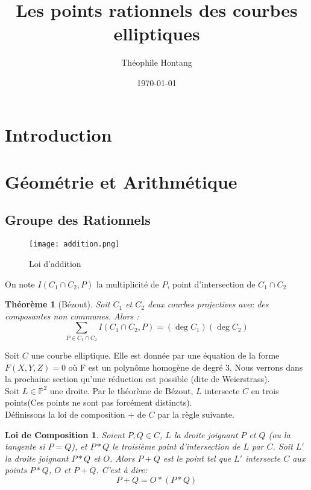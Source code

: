 \documentclass[a4paper]{article}
\title{Les points rationnels des courbes elliptiques}
\author{Théophile Hontang}
\date{\today}
\newtheorem{theorem}{Théorème}
\newtheorem{loi}{Loi de Composition}
\begin{document}
\maketitle
\tableofcontents
\newpage
\section*{Introduction}

\newpage


\section{Géométrie et Arithmétique}
\subsection{Groupe des Rationnels}
\begin{figure}[h]
\centering
\texttt{[image: addition.png]}
\caption{Loi d'addition}
\label{neutre}
\end{figure} 
On note $I(C_{1} \cap C_{2},P)$ la multiplicité de $P$, point d'intersection de $C_{1} \cap C_{2}$
\begin{theorem}[Bézout]
Soit $C_{1}$ et $C_{2}$ deux courbes projectives avec des composantes non communes. Alors :
\begin{equation*}
\sum\limits_{P \in C_{1} \cap C_{2}} I(C_{1} \cap C_{2},P)=(\deg  C_{1})(\deg C_{2})
\end{equation*}
\end{theorem}
Soit $C$ une courbe elliptique. Elle est donnée par une équation de la forme \\ $F(X,Y,Z)=0$ où F est un polynôme homogène de degré 3. Nous verrons dans la prochaine section qu'une réduction est possible (dite de Weierstrass). \\
Soit $L \in \mathbb{P}^2$ une droite. Par le théorème de Bézout, $L$ intersecte $C$ en trois points(Ces points ne sont pas forcément distincts).\\
Définissons la loi de composition $+$ de $C$ par la règle suivante.

\begin{loi}
Soient $P,Q \in C$, $L$ la droite joignant $P$ et $Q$ (ou la tangente si $P=Q$), et $P*Q$ le troisième point d'intersection  de $L$ par $C$.
Soit $L'$ la droite joignant $P*Q$ et $O$. Alors $P+Q$ est le point tel que $L'$ intersecte $C$ aux points $P*Q$, $O$ et $P+Q$. C'est à dire:
\begin{equation*}
P+Q=O*(P*Q)
\end{equation*}
\end{loi}
\end{document}
